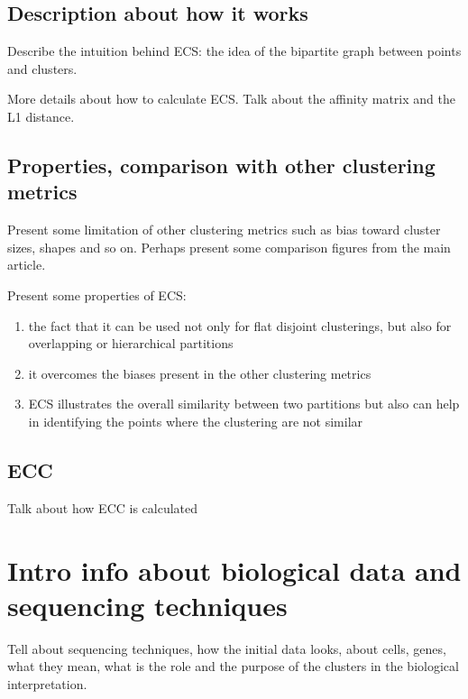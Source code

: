     \subsection{Description about how it works}
    Describe the intuition behind ECS: the idea of the bipartite graph between points and clusters.

    More details about how to calculate ECS. Talk about the affinity matrix and the L1 distance.
    \subsection{Properties, comparison with other clustering metrics}
    Present some limitation of other clustering metrics such as bias toward cluster sizes, shapes and so on. Perhaps present some comparison figures from the main article.

    Present some properties of ECS:
    \begin{enumerate}
        \item the fact that it can be used not only for flat disjoint clusterings, but also for overlapping or hierarchical partitions
        \item it overcomes the biases present in the other clustering metrics
        \item ECS illustrates the overall similarity between two partitions but also can help in identifying the points where the clustering are not similar
    \end{enumerate}
    \subsection{ECC}
    Talk about how ECC is calculated

\section{Intro info about biological data and sequencing techniques}
Tell about sequencing techniques, how the initial data looks, about cells, genes, what they mean, what is the role and the purpose of the clusters in the biological interpretation.

